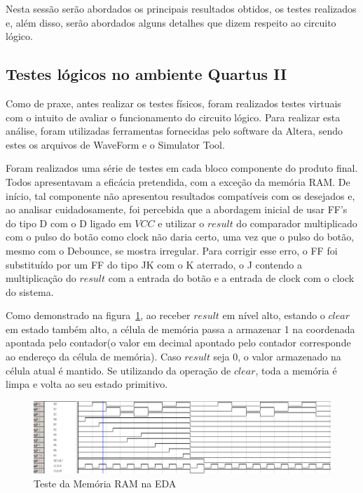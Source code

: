 \documentclass[12pt]{article}
\begin{document}
Nesta sessão serão abordados os principais resultados obtidos, os testes realizados e, além disso, serão abordados alguns detalhes que dizem respeito ao circuito lógico.

\subsection{Testes lógicos no ambiente Quartus II}

Como de praxe, antes realizar os testes físicos, foram realizados testes virtuais com o intuito de avaliar o funcionamento do circuito lógico.  Para realizar esta análise, foram utilizadas ferramentas fornecidas pelo software da Altera, sendo estes os arquivos de WaveForm e o Simulator Tool.

Foram realizados uma série de testes em cada bloco componente do produto final. Todos apresentavam a eficácia pretendida, com a exceção da memória RAM. De início, tal componente não apresentou resultados compatíveis com os desejados e, ao analisar cuidadosamente, foi percebida que a abordagem inicial de usar FF's do tipo D com o D ligado em $VCC$ e utilizar o $result$ do comparador multiplicado com o pulso do botão como clock não daria certo, uma vez que o pulso do botão, mesmo com o Debounce, se mostra irregular. Para corrigir esse erro, o FF foi substituído por um FF do tipo JK com o K aterrado, o J contendo a multiplicação do $result$ com a entrada do botão e a entrada de clock com o clock do sistema. 

Como demonstrado na figura~\ref{fig:teste-ram}, ao receber $result$ em nível alto, estando o $clear$ em estado também alto, a célula de memória passa a armazenar 1 na coordenada apontada pelo contador(o valor em decimal apontado pelo contador corresponde ao endereço da célula de memória). Caso $result$ seja 0, o valor armazenado na célula atual é mantido. Se utilizando da operação de $clear$, toda a memória é limpa e volta ao seu estado primitivo.

\begin{figure}[!htbp]
\centering
\includegraphics[width=1\textwidth]{img/testeram.png}
\caption{Teste da Memória RAM na EDA}
\label{fig:teste-ram}
\end{figure}
\end{document}
